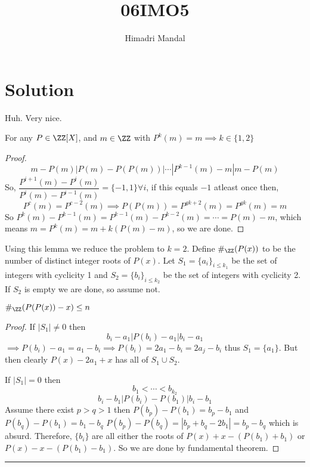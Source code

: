 \documentclass[11pt]{scrartcl}
\title{06IMO5}
\author{Himadri Mandal}
\begin{document}
\maketitle

\section{Solution}
\begin{soln}
Huh. Very nice.
\begin{lemma*}
  For any $P \in \ZZ[X]$, and $m \in \ZZ$ with 
  $P^k(m) = m \implies k \in \{1,2\}$ 
\end{lemma*}
\begin{proof}
  \[ m - P(m) | P(m) - P(P(m)) | \cdots | P^{k-1}(m) - m | m - P(m)\]
  So, $\dfrac{P^{i+1}(m) - P^i(m)}{P^i(m) - P^{i-1}(m)} = \{-1,1\} \forall i$, if this
  equals $-1$ atleast once then, 
  \[P^{c}(m) = P^{c-2}(m) \implies P(P(m)) = P^{gk+2}(m) = P^{gk}(m) = m\]
  So $P^{k}(m) - P^{k-1}(m) = P^{k-1}(m) - P^{k-2}(m) = \cdots = P(m) - m$, which means
  $m = P^k(m) = m+k(P(m) - m)$, so we are done.
\end{proof}
  Using this lemma we reduce the problem to $k = 2$. 
  Define $\#_{\ZZ}(P(x))$ to be the number of distinct
  integer roots of $P(x)$. Let $S_1 = \{a_i\}_{i \leq k_1}$ be the set of integers with
  cyclicity 1 and $S_2 = \{b_i\}_{i \leq k_2}$ be the set of integers 
  with cyclicity 2. If $S_2$ is empty we are done, so assume not.

\begin{claim*}
  $\#_{\ZZ}(P(P(x)) - x) \leq n$
\end{claim*}
\begin{proof}
  If $|S_1| \neq 0$ then
  \[ b_i - a_1 | P(b_i) - a_1 | b_i - a_1 \]
  $\implies P(b_i) - a_1 = a_1 - b_i \implies P(b_i) = 2a_1 - b_i = 2a_j - b_i$
  thus $S_1 = \{a_1\}$. But then clearly $P(x)-2a_1+x$ has all of 
  $S_1 \cup S_2$. 
  
  If $|S_1| = 0$ then
  \[ b_1 < \cdots < b_{k_2} \]
  \[ b_i - b_1 | P(b_i) - P(b_1) | b_i - b_1 \]
  Assume there exist $p > q > 1$ then 
  $P(b_p) - P(b_1) = b_p - b_1$ and $P(b_q) - P(b_1) = b_1 - b_q$
  $P(b_p) - P(b_q) = |b_p + b_q - 2b_1| = b_p - b_q$ which is absurd.
  Therefore, $\{b_i\}$ are all either the roots of
  $P(x)+x - (P(b_1)+b_1)$ or $P(x)-x - (P(b_1)-b_1)$.
  So we are done by fundamental theorem.
\setqed{$\blacksquare$}\end{proof} \setqed{$\square$}
\hrule

\bigskip
\setqed{} \end{soln} \setqed{$\square$}
\end{document}
